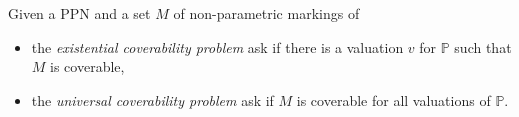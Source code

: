 \begin{defi}
  Given a \ac{PPN} \SPTPm and a set $M$ of non-parametric markings of \PPN
  \begin{itemize}
    \item the \emph{existential coverability problem} ask if there is a valuation $v$ for $\mathbb{P}$ such that $M$ is coverable,
    \item the \emph{universal   coverability problem} ask if $M$ is coverable for all valuations of $\mathbb{P}$.
  \end{itemize}
\end{defi}



